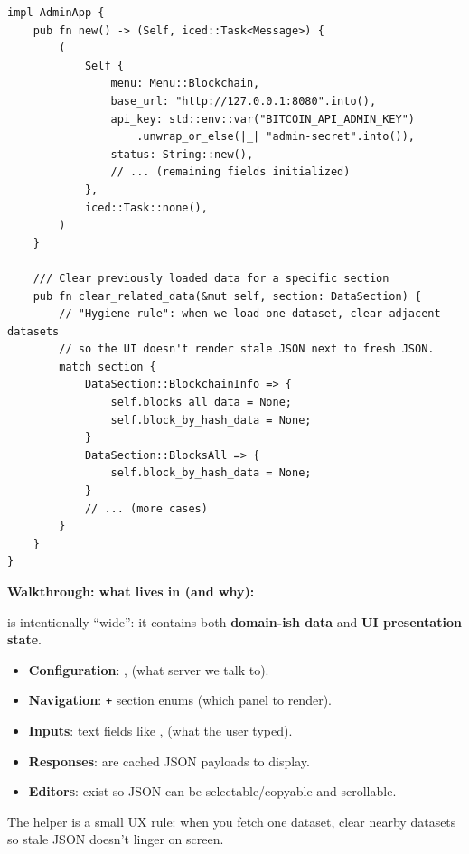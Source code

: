 \begin{listing}[H]
\begin{verbatim}
impl AdminApp {
    pub fn new() -> (Self, iced::Task<Message>) {
        (
            Self {
                menu: Menu::Blockchain,
                base_url: "http://127.0.0.1:8080".into(),
                api_key: std::env::var("BITCOIN_API_ADMIN_KEY")
                    .unwrap_or_else(|_| "admin-secret".into()),
                status: String::new(),
                // ... (remaining fields initialized)
            },
            iced::Task::none(),
        )
    }

    /// Clear previously loaded data for a specific section
    pub fn clear_related_data(&mut self, section: DataSection) {
        // "Hygiene rule": when we load one dataset, clear adjacent datasets
        // so the UI doesn't render stale JSON next to fresh JSON.
        match section {
            DataSection::BlockchainInfo => {
                self.blocks_all_data = None;
                self.block_by_hash_data = None;
            }
            DataSection::BlocksAll => {
                self.block_by_hash_data = None;
            }
            // ... (more cases)
        }
    }
}
\end{verbatim}
\end{listing}

\textbf{Walkthrough: what lives in  (and why):}

 is intentionally ``wide'': it contains both \textbf{domain-ish data} and \textbf{UI presentation state}.

\begin{itemize}
  \item \textbf{Configuration}: ,  (what server we talk to).
  \item \textbf{Navigation}:  \texttt{+} section enums (which panel to render).
  \item \textbf{Inputs}: text fields like ,  (what the user typed).
  \item \textbf{Responses}:  are cached JSON payloads to display.
  \item \textbf{Editors}:  exist so JSON can be selectable/copyable and scrollable.
\end{itemize}

The  helper is a small UX rule: when you fetch one dataset, clear nearby datasets so stale JSON doesn't linger on screen.

